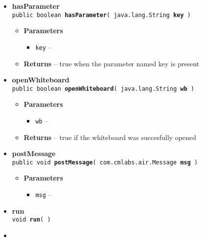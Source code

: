 {{{\begin{itemize}
{\begin{itemize}
{}%
\end{itemize}
}%
 \item{ 
{\bf hasParameter}\\
{\tt public boolean\ {\bf hasParameter}( {\tt java.lang.String} {\bf key} )
\label{amber.common.AirBrush.hasParameter(java.lang.String)}}%
\begin{itemize}
\item{
{\bf Parameters}
  \begin{itemize}
   \item{
{\tt key} -- }
  \end{itemize}
}%
\item{{\bf Returns} -- 
true when the parameter named key is present 
}%
\end{itemize}
}%
 \item{ 
{\bf openWhiteboard}\\
{\tt public boolean\ {\bf openWhiteboard}( {\tt java.lang.String} {\bf wb} )
\label{amber.common.AirBrush.openWhiteboard(java.lang.String)}}%
\begin{itemize}
\item{
{\bf Parameters}
  \begin{itemize}
   \item{
{\tt wb} -- }
  \end{itemize}
}%
\item{{\bf Returns} -- 
true if the whiteboard was succesfully opened 
}%
\end{itemize}
}%
 \item{ 
{\bf postMessage}\\
{\tt public void\ {\bf postMessage}( {\tt com.cmlabs.air.Message} {\bf msg} )
\label{amber.common.AirBrush.postMessage(com.cmlabs.air.Message)}}%
\begin{itemize}
\item{
{\bf Parameters}
  \begin{itemize}
   \item{
{\tt msg} -- }
  \end{itemize}
}%
\end{itemize}
}%
 \item{ 
{\bf run}\\
{\tt  void\ {\bf run}(  )
\label{amber.common.AirBrush.run()}}%
}%
 \item{ 
}
\end{itemize}}}}
